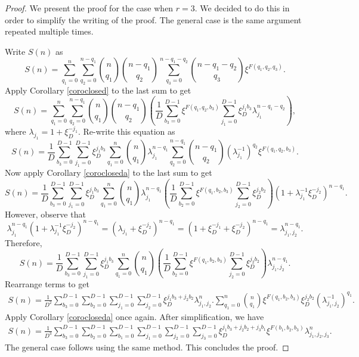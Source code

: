 \begin{proof}
 We present the proof for the case when $r=3$.  We decided to do this in order to simplify the writing of the proof.  The general case is the same argument repeated multiple times.
 
 Write $S(n)$ as
 \begin{equation}
  S(n)=\sum_{q_1=0}^n\sum_{q_2=0}^{n-q_1} \binom{n}{q_1}\binom{n-q_1}{q_2}\sum_{q_3=0}^{n-q_1-q_2}\binom{n-q_{1}-q_2}{q_3}\xi^{F(q_1,q_2,q_3)}.
 \end{equation}
Apply Corollary \ref{coroclosed} to the last sum to get
\begin{equation}
  S(n)=\sum_{q_1=0}^n\sum_{q_2=0}^{n-q_1} \binom{n}{q_1}\binom{n-q_1}{q_2}\left(\frac{1}{D}\sum_{b_3=0}^{D-1}\xi^{F(q_1,q_2,b_3)}
  \sum_{j_1=0}^{D-1}\xi_D^{j_1b_3}\lambda_{j_1}^{n-q_1-q_2}\right),
\end{equation}
where $\lambda_{j_1} = 1+\xi_D^{-j_1}$.  Re-write this equation as
\begin{equation}
\label{after1step}
 S(n)=\frac{1}{D}\sum_{b_3=0}^{D-1}\sum_{j_1=0}^{D-1}\xi_D^{j_1b_3}\sum_{q_1=0}^n\binom{n}{q_1}\lambda_{j_1}^{n-q_1}\sum_{q_2=0}^{n-q_1} \binom{n-q_1}{q_2}(\lambda_{j_1}^{-1})^{q_2}\xi^{F(q_1,q_{2},b_3)}.
\end{equation}
Now apply Corollary \ref{corocloseda} to the last sum to get
\begin{equation}
\label{axuliary1}
 S(n)=\frac{1}{D}\sum_{b_3=0}^{D-1}\sum_{j_1=0}^{D-1}\xi_D^{j_1b_3}\sum_{q_1=0}^n\binom{n}{q_1}\lambda_{j_1}^{n-q_1}\left(\frac{1}{D}\sum_{b_2=0}^{D-1}\xi^{F(q_1,b_2,b_3)}\sum_{j_2=0}^{D-1}\xi_D^{j_2b_2}\right)
 (1+\lambda_{j_1}^{-1}\xi_D^{-j_2})^{n-q_1}.
 \end{equation}
However, observe that 
$$\lambda_{j_1}^{n-q_1}(1+\lambda_{j_1}^{-1}\xi_D^{-j_2})^{n-q_1}=(\lambda_{j_1}+\xi_D^{-j_2})^{n-q_1}=(1+\xi_D^{-j_1}+\xi_D^{-j_2})^{n-q_1}=\lambda_{j_1,j_2}^{n-q_1}.$$
Therefore,
\begin{equation}
\label{axuliary2}
 S(n)=\frac{1}{D}\sum_{b_3=0}^{D-1}\sum_{j_1=0}^{D-1}\xi_D^{j_1b_3}\sum_{q_1=0}^n\binom{n}{q_1}\left(\frac{1}{D}\sum_{b_2=0}^{D-1}\xi^{F(q_1,b_2,b_3)}\sum_{j_2=0}^{D-1}\xi_D^{j_2b_2}\right)
 \lambda_{j_1,j_2}^{n-q_1}.
 \end{equation}
Rearrange terms to get
\begin{align}
 S(n)=\frac{1}{D^2}\sum_{b_3=0}^{D-1}\sum_{b_2=0}^{D-1}\sum_{j_1=0}^{D-1}\sum_{j_2=0}^{D-1}\xi_D^{j_1b_3+j_2b_2}\lambda_{j_1,j_2}^{n}.\sum_{q_1=0}^n\binom{n}{q_1}\xi^{F(q_1,b_2,b_3)}\xi_D^{j_2b_2}(\lambda_{j_1,j_2}^{-1})^{q_1}.
\end{align}
Apply Corollary \ref{corocloseda} once again. After simplification, we have
\begin{align}
 S(n)=\frac{1}{D^3}\sum_{b_3=0}^{D-1}\sum_{b_2=0}^{D-1}\sum_{b_1=0}^{D-1}\sum_{j_1=0}^{D-1}\sum_{j_2=0}^{D-1}\sum_{j_3=0}^{D-1}\xi_D^{j_1b_3+j_2b_2+j_3b_1}\xi^{F(b_1,b_2,b_3)}\lambda_{j_1,j_2,j_3}^n.
\end{align}
The general case follows using the same method.  This concludes the proof.
\end{proof}


